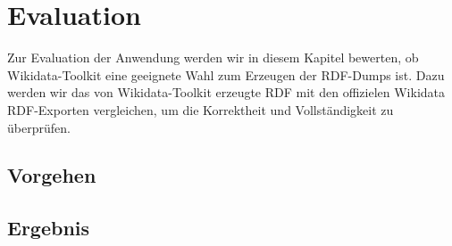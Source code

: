 \chapter{Evaluation}
\label{chap:evaluation}
Zur Evaluation der Anwendung werden wir in diesem Kapitel bewerten, ob Wikidata-Toolkit eine geeignete Wahl zum Erzeugen der RDF-Dumps ist.
Dazu werden wir das von Wikidata-Toolkit erzeugte RDF mit den offizielen Wikidata RDF-Exporten vergleichen, um die Korrektheit und Vollständigkeit zu überprüfen.

\section{Vorgehen}


\section{Ergebnis} 

